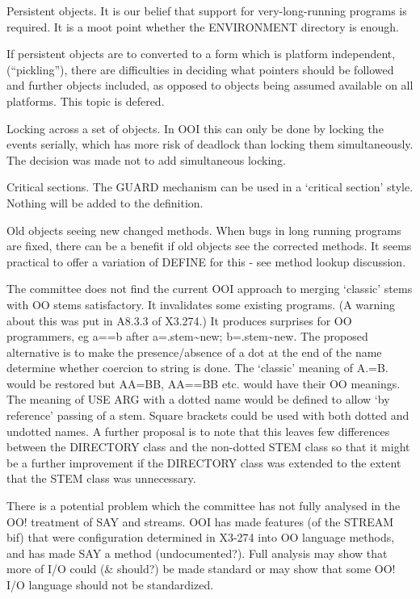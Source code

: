 Persistent objects. It is our belief that support for very-long-running
programs is required. It is a moot point whether the ENVIRONMENT
directory is enough.

If persistent objects are to converted to a form which is platform
independent, (``pickling''), there are difficulties in deciding what
pointers should be followed and further objects included, as opposed to
objects being assumed available on all platforms. This topic is defered.

Locking across a set of objects. In OOI this can only be done by locking
the events serially, which has more risk of deadlock than locking them
simultaneously. The decision was made not to add simultaneous locking.

Critical sections. The GUARD mechanism can be used in a `critical
section' style. Nothing will be added to the definition.

Old objects seeing new changed methods. When bugs in long running
programs are fixed, there can be a benefit if old objects see the
corrected methods. It seems practical to offer a variation of DEFINE for
this - see method lookup discussion.

The committee does not find the current OOI approach to merging
`classic' stems with OO stems satisfactory. It invalidates some existing
programs. (A warning about this was put in A8.3.3 of X3.274.) It
produces surprises for OO programmers, eg a==b after
a=.stem\textasciitilde new; b=.stem\textasciitilde new. The proposed
alternative is to make the presence/absence of a dot at the end of the
name determine whether coercion to string is done. The `classic' meaning
of A.=B. would be restored but AA=BB, AA==BB etc. would have their OO
meanings. The meaning of USE ARG with a dotted name would be defined to
allow `by reference' passing of a stem. Square brackets could be used
with both dotted and undotted names. A further proposal is to note that
this leaves few differences between the DIRECTORY class and the
non-dotted STEM class so that it might be a further improvement if the
DIRECTORY class was extended to the extent that the STEM class was
unnecessary.

There is a potential problem which the committee has not fully analysed
in the OO! treatment of SAY and streams. OOI has made features (of the
STREAM bif) that were configuration determined in X3-274 into OO
language methods, and has made SAY a method (undocumented?). Full
analysis may show that more of I/O could (\& should?) be made standard
or may show that some OO! I/O language should not be standardized.

